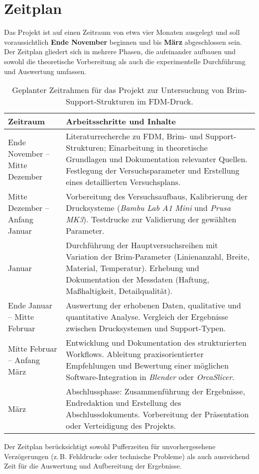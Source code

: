 \chapter{Zeitplan}
\label{cha:Zeitplan}

Das Projekt ist auf einen Zeitraum von etwa vier Monaten ausgelegt und soll voraussichtlich \textbf{Ende November} beginnen und bis \textbf{März} abgeschlossen sein.  
Der Zeitplan gliedert sich in mehrere Phasen, die aufeinander aufbauen und sowohl die theoretische Vorbereitung als auch die experimentelle Durchführung und Auswertung umfassen.

\begin{table}[h!]
\centering
\begin{tabular}{p{4cm} p{9cm}}
\textbf{Zeitraum} & \textbf{Arbeitsschritte und Inhalte} \\
\hline
Ende November – Mitte Dezember & 
Literaturrecherche zu FDM, Brim- und Support-Strukturen; Einarbeitung in theoretische Grundlagen und Dokumentation relevanter Quellen. 
Festlegung der Versuchsparameter und Erstellung eines detaillierten Versuchsplans. \\[6pt]

Mitte Dezember – Anfang Januar & 
Vorbereitung des Versuchsaufbaus, Kalibrierung der Drucksysteme (\textit{Bambu Lab A1 Mini} und \textit{Prusa MK3}). 
Testdrucke zur Validierung der gewählten Parameter. \\[6pt]

Januar & 
Durchführung der Hauptversuchsreihen mit Variation der Brim-Parameter (Linienanzahl, Breite, Material, Temperatur). 
Erhebung und Dokumentation der Messdaten (Haftung, Maßhaltigkeit, Detailqualität). \\[6pt]

Ende Januar – Mitte Februar & 
Auswertung der erhobenen Daten, qualitative und quantitative Analyse. 
Vergleich der Ergebnisse zwischen Drucksystemen und Support-Typen. \\[6pt]

Mitte Februar – Anfang März & 
Entwicklung und Dokumentation des strukturierten Workflows. 
Ableitung praxisorientierter Empfehlungen und Bewertung einer möglichen Software-Integration in \textit{Blender} oder \textit{OrcaSlicer}. \\[6pt]

März & 
Abschlussphase: Zusammenführung der Ergebnisse, Endredaktion und Erstellung des Abschlussdokuments. 
Vorbereitung der Präsentation oder Verteidigung des Projekts. \\
\hline
\end{tabular}
\caption{Geplanter Zeitrahmen für das Projekt zur Untersuchung von Brim-Support-Strukturen im FDM-Druck.}
\end{table}

Der Zeitplan berücksichtigt sowohl Pufferzeiten für unvorhergesehene Verzögerungen (z.\,B. Fehldrucke oder technische Probleme) als auch ausreichend Zeit für die Auswertung und Aufbereitung der Ergebnisse.
